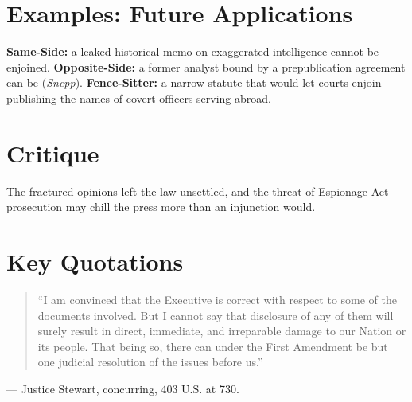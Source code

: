 \documentclass[12pt]{article}
\begin{document}
\section{Examples: Future Applications}
\textbf{Same-Side:} a leaked historical memo on exaggerated intelligence cannot be enjoined. \textbf{Opposite-Side:} a former analyst bound by a prepublication agreement can be (\textit{Snepp}). \textbf{Fence-Sitter:} a narrow statute that would let courts enjoin publishing the names of covert officers serving abroad.

\section{Critique}
The fractured opinions left the law unsettled, and the threat of Espionage Act prosecution may chill the press more than an injunction would.

\section{Key Quotations}
\begin{quote}
``I am convinced that the Executive is correct with respect to some of the documents involved. But I cannot say that disclosure of any of them will surely result in direct, immediate, and irreparable damage to our Nation or its people. That being so, there can under the First Amendment be but one judicial resolution of the issues before us.''
\end{quote}
\noindent --- Justice Stewart, concurring, 403 U.S. at 730.
\end{document}
